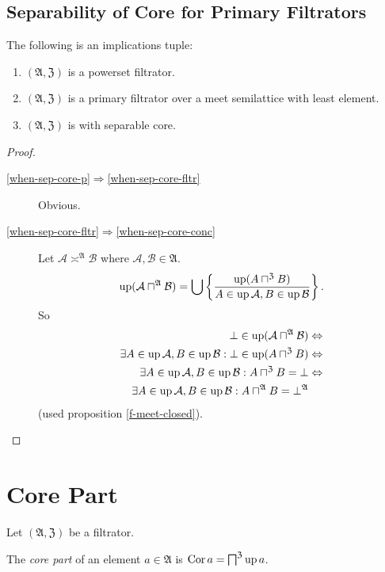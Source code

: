 \subsection{Separability of Core for Primary Filtrators}
\begin{thm}
\label{when-sep-core}The following is an implications tuple:
\begin{enumerate}
\item \label{when-sep-core-p}$(\mathfrak{A},\mathfrak{Z})$ is a powerset
filtrator.
\item \label{when-sep-core-fltr}$(\mathfrak{A},\mathfrak{Z})$ is a primary
filtrator over a meet semilattice with least element.
\item \label{when-sep-core-conc}$(\mathfrak{A},\mathfrak{Z})$ is with
separable core.
\end{enumerate}
\end{thm}
\begin{proof}
~
\begin{description}
\item [{\ref{when-sep-core-p}$\Rightarrow$\ref{when-sep-core-fltr}}] Obvious.
\item [{\ref{when-sep-core-fltr}$\Rightarrow$\ref{when-sep-core-conc}}] Let
$\mathcal{A}\asymp^{\mathfrak{A}}\mathcal{B}$ where $\mathcal{A},\mathcal{B}\in\mathfrak{A}$.
\[
\operatorname{up}(\mathcal{A}\sqcap^{\mathfrak{A}}\mathcal{B})=\bigcup\left\{ \frac{\operatorname{up}(A\sqcap^{\mathfrak{Z}}B)}{A\in\operatorname{up}\mathcal{A},B\in\operatorname{up}\mathcal{B}}\right\}.
\]
So
\begin{align*}
\bot\in\operatorname{up}(\mathcal{A}\sqcap^{\mathfrak{A}}\mathcal{B}) & \Leftrightarrow\\
\exists A\in\operatorname{up}\mathcal{A},B\in\operatorname{up}\mathcal{B}:\bot\in\operatorname{up}(A\sqcap^{\mathfrak{Z}}B) & \Leftrightarrow\\
\exists A\in\operatorname{up}\mathcal{A},B\in\operatorname{up}\mathcal{B}:A\sqcap^{\mathfrak{Z}}B=\bot & \Leftrightarrow\\
\exists A\in\operatorname{up}\mathcal{A},B\in\operatorname{up}\mathcal{B}:A\sqcap^{\mathfrak{A}}B=\bot^{\mathfrak{A}}
\end{align*}
(used proposition \ref{f-meet-closed}).
\end{description}
\end{proof}

\section{Core Part}
Let $(\mathfrak{A},\mathfrak{Z})$ be a filtrator.
\begin{defn}
The \emph{core part} of an element $a\in\mathfrak{A}$
is $\operatorname{Cor} a=\bigsqcap^{\mathfrak{Z}}\operatorname{up} a$.
\end{defn}

